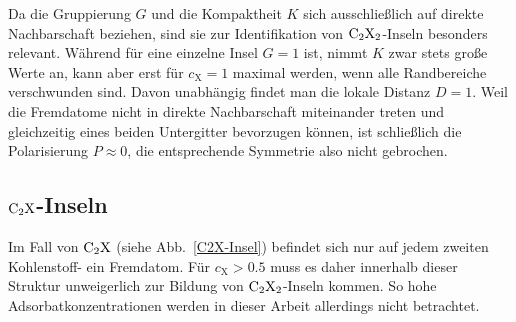\documentclass[a4paper, 10pt, twoside, openany]{book} %
\def \cX {c_\mathrm{X}}
\begin{document}
	Da die Gruppierung $G$ und die Kompaktheit $K$ sich ausschließlich auf direkte Nachbarschaft beziehen, sind sie zur Identifikation von $\rm C_2X_2$-Inseln besonders relevant. Während für eine einzelne Insel $G = 1$ ist, nimmt $K$ zwar stets große Werte an, kann aber erst für $\cX = 1$ maximal werden, wenn alle Randbereiche verschwunden sind. Davon unabhängig findet man die lokale Distanz $D = 1$. Weil die Fremdatome nicht in direkte Nachbarschaft miteinander treten und gleichzeitig eines beiden Untergitter bevorzugen können, ist schließlich die Polarisierung $P \approx 0$, die entsprechende Symmetrie also nicht gebrochen.
	
	\subsection{$\rm C_2X$-Inseln}
	
	Im Fall von $\rm C_2X$ (siehe Abb.~\ref{C2X-Insel}) befindet sich nur auf jedem zweiten Kohlenstoff- ein Fremdatom. Für $\cX > 0.5$ muss es daher innerhalb dieser Struktur unweigerlich zur Bildung von $\rm C_2X_2$-Inseln kommen. So hohe Adsorbatkonzentrationen werden in dieser Arbeit allerdings nicht betrachtet.
	
\end{document}
